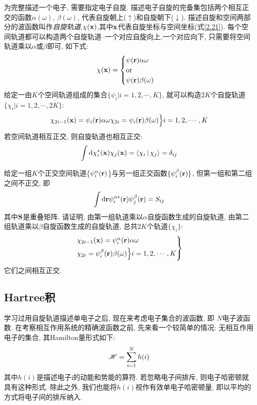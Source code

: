 为完整描述一个电子, 需要指定电子自旋. 描述电子自旋的完备集包括两个相互正交的函数$\alpha(\omega),\,\beta(\omega)$, 代表自旋朝上($\uparrow$)和自旋朝下($\downarrow$). 描述自旋和空间两部分的波函数叫作\emph{自旋轨道},$\chi(\mathbf{x})$,其中$\mathbf{x}$代表自旋坐标与空间坐标(式\ref{2.21}). 每个空间轨道都可以构造两个自旋轨道--一个对应自旋向上,一个对应向下, 只需要将空间轨道乘以$\alpha$或$\beta$即可, 如下式:
\begin{equation}
	\chi(\mathbf{x})=
	\begin{cases}
	\psi(\mathbf{r})\alpha{\omega}\\
	\text{or}\\
	\psi(\mathbf{r})\beta(\omega)
	\end{cases}
\end{equation}
给定一由$K$个空间轨道组成的集合$\{\psi_i|i=1,2,\cdots,K \}$, 就可以构造$2K$个自旋轨道$\{\chi_i|i=1,2,\cdots, 2K\}$:
\begin{equation}
\chi_{2i-1}(\mathbf{x})=\psi_i(\mathbf{r})\alpha{\omega}\\
\chi_{2i}=\psi_i(\mathbf{r})\beta(\omega)
\Big\}i=1,2,\cdots,K
\end{equation}
若空间轨道相互正交, 则自旋轨道也相互正交:
\begin{equation}
\int\dd\chi_i^*(\bo{x})\chi_j(\bo{x})=\braket{\chi_i|\chi_j}=\delta_{ij}
\end{equation}
\begin{xercise}
给定一组$K$个正交空间轨道\{$\psi_i^\alpha(\mathbf{r})$\}与另一组正交函数$\{\psi_i^\beta(\mathbf{r})\}$, 但第一组和第二组之间不正交, 即
\[
\int\dd\bo{r}\psi_i^{\alpha*}(\bo{r})\psi_j^\beta(\bo{r})=S_{ij}
\]
其中$\mathbf{S}$是重叠矩阵. 请证明, 由第一组轨道乘以$\alpha$自旋函数生成的自旋轨道, 由第二组轨道乘以$\beta$自旋函数生成的自旋轨道, 总共$2K$个轨道$\{\chi_i \}$:
\begin{equation*}
\begin{rcases}
\chi_{2i-1}(\mathbf{x})=\psi_i^\alpha(\mathbf{r})\alpha{\omega}\\
\chi_{2i}=\psi_i^\beta(\mathbf{r})\beta(\omega)
\Big\}i=1,2,\cdots,K
\end{rcases}
\end{equation*}
它们之间相互正交.
\end{xercise}
\subsection{Hartree积}
 \label{sec2.2.2}
学习过用自旋轨道描述单电子之后, 现在来考虑电子集合的波函数, 即 $N$电子波函数. 在考察相互作用系统的精确波函数之前, 先来看一个较简单的情况: 无相互作用电子的集合, 其Hamilton量形式如下:
\begin{equation}
\label{2.28}
\mathscr{H}=\sum_{i=1}^{N}h(i)
\end{equation}
其中$h(i)$是描述电子i的动能和势能的算符. 若忽略电子间排斥, 则电子哈密顿就具有这种形式. 除此之外, 我们也能将$h(i)$视作有效单电子哈密顿量, 即以平均的方式将电子间的排斥纳入.


